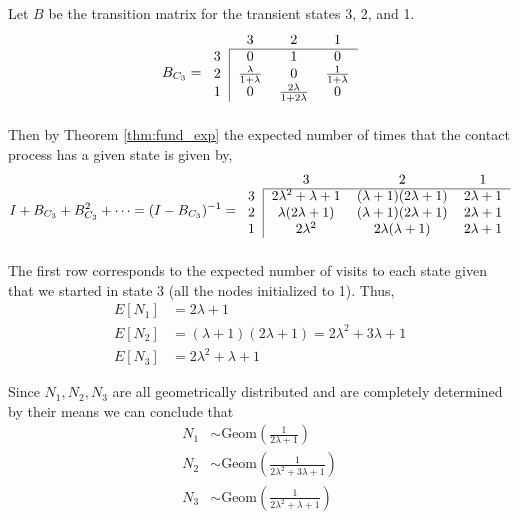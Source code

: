 
Let $B$ be the transition matrix for the transient states 3, 2, and 1.
$$
B_{C_3} = \begin{blockarray}{cccc}
    & 3 & 2 & 1\\
    \begin{block}{c|ccc}
    \cline{2-4}
        3 & 0 & 1 & 0\\
        2 & \frac{\lambda}{1 + \lambda} & 0 &
        \frac{1}{1 + \lambda}\\
        1 & 0 & \frac{2\lambda}{1 + 2 \lambda} & 0\\
    \end{block}
    \end{blockarray}
$$
Then by Theorem \ref{thm:fund_exp} the expected number of times that the contact process has a given state is given by,
$$
    I + B_{C_3} + B_{C_3}^2 + \cdots = (I - B_{C_3})^{-1} = \begin{blockarray}{cccc}
    & 3 & 2 & 1\\
    \begin{block}{c|ccc}
    \cline{2-4}
    3 & 2 \lambda^2 + \lambda + 1 & (\lambda + 1) (2 \lambda + 1) &  2 \lambda + 1\\
    2 & \lambda (2 \lambda + 1) & (\lambda + 1)(2 \lambda + 1) & 2 \lambda + 1\\
    1 & 2 \lambda^2 & 2 \lambda ( \lambda + 1) &  2\lambda + 1\\
    \end{block}
    \end{blockarray}
$$
The first row corresponds to the expected number of visits to each state given that we started in state 3 (all the nodes initialized to 1).
Thus,
\begin{align*}
    E[N_1] &= 2 \lambda + 1\\
    E[N_2] &= (\lambda + 1) (2 \lambda + 1) = 2\lambda^2 + 3 \lambda + 1\\
    E[N_3] &=  2 \lambda^2 + \lambda + 1
\end{align*}

Since $N_1, N_2, N_3$ are all geometrically distributed and are completely determined by their means we can conclude that
\begin{align*}
    N_1 &\sim  \text{Geom}\left(\frac{1}{2 \lambda + 1} \right)\\
    N_2 &\sim \text{Geom}\left(\frac{1}{2\lambda^2 + 3 \lambda + 1} \right)\\
    N_3 &\sim  \text{Geom}\left(\frac{1}{2 \lambda^2 + \lambda + 1}\right)
\end{align*}

